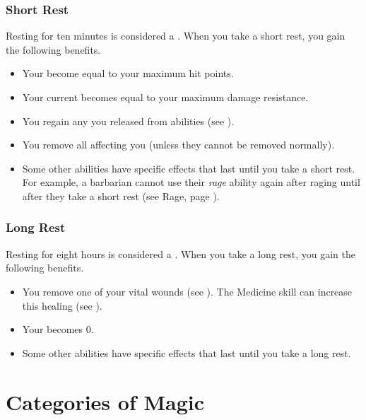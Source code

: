         \subsubsection{Short Rest}\label{Short Rest}
            Resting for ten minutes is considered a .
            When you take a short rest, you gain the following benefits.
            \begin{itemize}
                \item Your  become equal to your maximum hit points.
                \item Your current  becomes equal to your maximum damage resistance.
                \item You regain any  you released from  abilities (see ).
                \item You remove all  affecting you (unless they cannot be removed normally).
                \item Some other abilities have specific effects that last until you take a short rest.
                    For example, a barbarian cannot use their \textit{rage} ability again after raging until after they take a short rest (see Rage, page ).
            \end{itemize}

        \subsubsection{Long Rest}\label{Long Rest}
            Resting for eight hours is considered a .
            When you take a long rest, you gain the following benefits.
            \begin{itemize}
                \item You remove one of your vital wounds (see ).
                    The Medicine skill can increase this healing (see ).
                \item Your  becomes 0.
                \item Some other abilities have specific effects that last until you take a long rest.
            \end{itemize}

\section{Categories of Magic}

